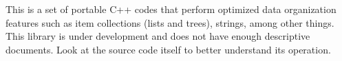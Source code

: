 This is a set of portable C++ codes that perform optimized data organization features such as item collections (lists and trees), strings, among other things. This library is under development and does not have enough descriptive documents. Look at the source code itself to better understand its operation. 